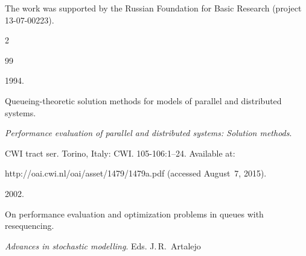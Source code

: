 \Ack


\noindent


The work was supported by the Russian Foundation for Basic Research (project 13-07-00223).
















  \begin{multicols}{2}





\renewcommand{\bibname}{\protect\rmfamily References}







{\small\frenchspacing


 {%




 \begin{thebibliography}{99}










 1994. 


Queueing-theoretic solution methods for models of parallel and distributed systems.


\textit{Performance evaluation of parallel and distributed systems: Solution methods}. 


CWI tract ser. Torino, Italy: CWI. 105-106:1--24. Available at: 


{\sf http://oai.cwi.nl/oai/asset/1479/1479a.pdf} (accessed August~7, 2015).










 2002.


On performance evaluation and optimization problems in queues with resequencing.


\textit{Advances in stochastic modelling}. Eds. J.\,R.~Artalejo



\end{thebibliography}}}
\end{multicols}
